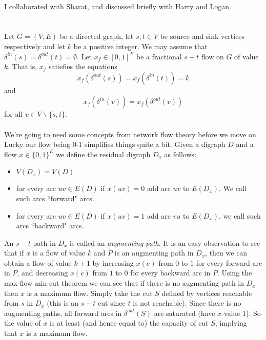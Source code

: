 \documentclass[letterpaper,12pt,oneside,onecolumn]{article}
\begin{document}
	\paragraph{}
	I collaborated with Sharat, and discussed briefly with Harry and Logan.
	\section{}
	\paragraph{}
	Let $G=(V,E)$ be a directed graph, let $s,t\in V$ be source and sink vertices respectively and let $k$ be a positive integer. We may assume that $\delta^{in}(s) = \delta^{out}(t) = \emptyset$. Let $x_f \in [0,1]^E$ be a fractional $s-t$ flow on $G$ of value $k$. That is, $x_f$ satisfies the equations
	$$ x_f(\delta^{out}(s)) = x_f(\delta^{in}(t)) = k$$
	and
	$$x_f(\delta^{in}(v)) = x_f(\delta^{out}(v))$$
	for all $v \in V\backslash\{s,t\}$.
	\paragraph{}
	We're going to need some concepts from network flow theory before we move on. Lucky our flow being $0$-$1$ simplifies things quite a bit. Given a digraph $D$ and a flow $x \in \{0,1\}^E$ we define the residual digraph $D_x$ as follows: 
	\begin{itemize}
		\item$V(D_x) = V(D)$
		\item for every arc $uv \in E(D)$ if $x(uv) = 0$ add arc $uv$ to $E(D_x)$. We call such arcs ``forward" arcs.
		\item for every arc $uv \in E(D)$ if $x(uv) = 1$ add arc $vu$ to $E(D_x)$. we call such arcs ``backward" arcs.
	\end{itemize} 
	An $s-t$ path in $D_x$ is called an \emph{augmenting path}. It is an easy observation to see that if $x$ is a flow of value $k$ and $P$ is an augmenting path in $D_x$, then we can obtain a flow of value $k+1$ by increasing $x(e)$ from $0$ to $1$ for every forward arc in $P$, and decreasing $x(e)$ from $1$ to $0$ for every backward arc in $P$. Using the max-flow min-cut theorem we can see that if there is no augmenting path in $D_x$ then $x$ is a maximum flow. Simply take the cut $S$ defined by vertices reachable from $s$ in $D_x$ (this is an $s-t$ cut since $t$ is not reachable). Since there is no augmenting paths, all forward arcs in $\delta^{out}(S)$ are saturated (have $x$-value $1$). So the value of $x$ is at least (and hence equal to) the capacity of cut $S$, implying that $x$ is a maximum flow.
\end{document}
